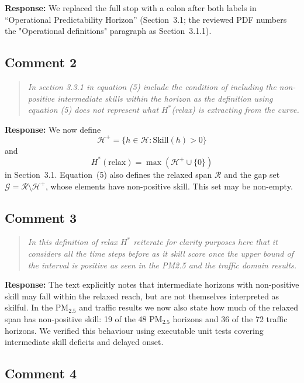 \documentclass[11pt,a4paper]{article}
\let\originalsubsection\subsection
\renewcommand{\subsection}{\Needspace{9\baselineskip}\originalsubsection}
\newenvironment{reviewcomment}
  {\begin{quote}\itshape}
  {\end{quote}}
\newcommand{\response}{\noindent\textbf{Response:} }
\begin{document}
\response
We replaced the full stop with a colon after both labels in
``Operational Predictability Horizon'' (Section~3.1; the reviewed PDF numbers the "Operational definitions" paragraph as Section~3.1.1).


\subsection*{Comment 2}

\begin{reviewcomment}
In section 3.3.1 in equation (5) include the condition of including the non-positive intermediate skills within the horizon as the definition using equation (5) does not represent what $H^*$(relax) is extracting from the curve.
\end{reviewcomment}

\response
We now define
\[
\mathcal{H}^{+}
=
\{h\in\mathcal{H}:\mathrm{Skill}(h)>0\}
\]
and
\[
H^*(\mathrm{relax})
=
\max\left(\mathcal{H}^{+}\cup\{0\}\right)
\]
in Section~3.1. Equation~(5) also defines the relaxed span $\mathcal{R}$
and the gap set $\mathcal{G}=\mathcal{R}\setminus\mathcal{H}^{+}$,
whose elements have non-positive skill. This set may be non-empty.


\subsection*{Comment 3}

\begin{reviewcomment}
In this definition of relax $H^*$ reiterate for clarity purposes here that it considers all the time steps before as it skill score once the upper bound of the interval is positive as seen in the PM2.5 and the traffic domain results.
\end{reviewcomment}

\response
The text explicitly notes that intermediate horizons with non-positive skill
may fall within the relaxed reach, but are not themselves interpreted as
skilful. In the PM$_{2.5}$ and traffic results we now also state how much of the relaxed
span has non-positive skill: 19 of the 48 PM$_{2.5}$ horizons and 36 of the 72 traffic horizons.
We verified this behaviour using executable unit tests covering
intermediate skill deficits and delayed onset.


\subsection*{Comment 4}
\end{document}
